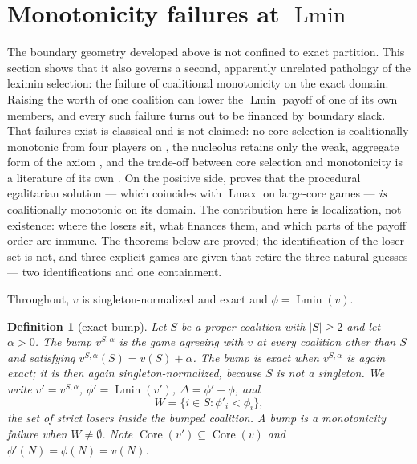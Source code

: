 \documentclass[11pt]{article}
\newtheorem{definition}[theorem]{Definition}
\newcommand{\core}{\operatorname{Core}}
\newcommand{\Lmin}{\operatorname{Lmin}}
\newcommand{\Lmax}{\operatorname{Lmax}}
\begin{document}
\section{Monotonicity failures at $\Lmin$}
\label{sec:mono}

The boundary geometry developed above is not confined to exact partition.
This section shows that it also governs a second, apparently unrelated
pathology of the leximin selection: the failure of coalitional monotonicity
on the exact domain.  Raising the worth of one coalition can lower the
$\Lmin$ payoff of one of its own members, and every such failure turns out to
be financed by boundary slack.  That failures exist is classical and is not
claimed: no core selection is coalitionally monotonic from four players on
\citep{Young1985,HousmanClark1998}, the nucleolus retains only the weak,
aggregate form of the axiom \citep{Zhou1991}, and the trade-off between
core selection and monotonicity is a literature of its own
\citep{Arin2013}.  On the positive side, \citet{Dietzenbacher2021} proves
that the procedural egalitarian solution --- which coincides with $\Lmax$
on large-core games --- \emph{is} coalitionally monotonic on its domain.
The contribution here is localization, not existence: where the losers sit,
what finances them, and which parts of the payoff order are immune.  The
theorems below are proved; the identification of the loser set is not, and
three explicit games are given that retire the three natural guesses ---
two identifications and one containment.

Throughout, $v$ is singleton-normalized and exact and $\phi=\Lmin(v)$.

\begin{definition}[exact bump]\label{mono:def:bump}
Let $S$ be a proper coalition with $|S|\ge2$ and let $\alpha>0$.  The
\emph{bump} $v^{S,\alpha}$ is the game agreeing with $v$ at every coalition
other than $S$ and satisfying $v^{S,\alpha}(S)=v(S)+\alpha$.  The bump is
\emph{exact} when $v^{S,\alpha}$ is again exact; it is then again
singleton-normalized, because $S$ is not a singleton.  We write
$v'=v^{S,\alpha}$, $\phi'=\Lmin(v')$, $\Delta=\phi'-\phi$, and
\[
 W=\{i\in S:\phi'_i<\phi_i\},
\]
the set of \emph{strict losers inside the bumped coalition}.  A bump is a
\emph{monotonicity failure} when $W\ne\emptyset$.  Note $\core(v')\subseteq
\core(v)$ and $\phi'(N)=\phi(N)=v(N)$.
\end{definition}
\end{document}
